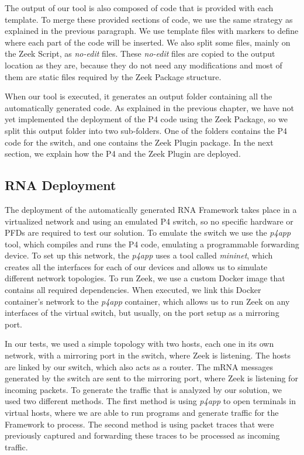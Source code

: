 The output of our tool is also composed of code that is provided with each template. To merge these provided sections of code, we use the same strategy as explained in the previous paragraph. We use template files with markers to define where each part of the code will be inserted. We also split some files, mainly on the Zeek Script, as \textit{no-edit} files. These \textit{no-edit} files are copied to the output location as they are, because they do not need any modifications and most of them are static files required by the Zeek Package structure.

When our tool is executed, it generates an output folder containing all the automatically generated code. As explained in the previous chapter, we have not yet implemented the deployment of the P4 code using the Zeek Package, so we split this output folder into two sub-folders. One of the folders contains the P4 code for the switch, and one contains the Zeek Plugin package. In the next section, we explain how the P4 and the Zeek Plugin are deployed.

\subsection{RNA Deployment}

The deployment of the automatically generated RNA Framework takes place in a virtualized network and using an emulated P4 switch, so no specific hardware or PFDs are required to test our solution. To emulate the switch we use the \textit{p4app} tool, which compiles and runs the P4 code, emulating a programmable forwarding device. To set up this network, the \textit{p4app} uses a tool called \textit{mininet}, which creates all the interfaces for each of our devices and allows us to simulate different network topologies. To run Zeek, we use a custom Docker image that contains all required dependencies. When executed, we link this Docker container's network to the \textit{p4app} container, which allows us to run Zeek on any interfaces of the virtual switch, but usually, on the port setup as a mirroring port.

In our tests, we used a simple topology with two hosts, each one in its own network, with a mirroring port in the switch, where Zeek is listening. The hosts are linked by our switch, which also acts as a router. The mRNA messages generated by the switch are sent to the mirroring port, where Zeek is listening for incoming packets. To generate the traffic that is analyzed by our solution, we used two different methods. The first method is using \textit{p4app} to open terminals in virtual hosts, where we are able to run programs and generate traffic for the Framework to process. The second method is using packet traces that were previously captured and forwarding these traces to be processed as incoming traffic.

